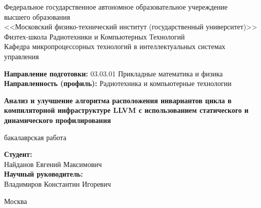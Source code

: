 \begin{center}
    Федеральное государственное автономное образовательное учереждение\\
    высшего образования\\
    <<Московский физико-технический институт (государственный университет)>> \\

    Физтех-школа Радиотехники и Компьютерных Технологий \\

    Кафедра микропроцессорных технологий в интеллектуальных системах управления\\

\end{center}

\vspace{1em}

\begin{flushleft}

    \textbf{Направление подготовки:} 03.03.01 Прикладные математика и физика\\
    \textbf{Направленность (профиль):} Радиотехника и компьютерные технологии\\

\end{flushleft}


\begin{center}
    \vspace{\fill}
    \Large{\textbf{Анализ и улучшение алгоритма расположения инвариантов цикла в компиляторной инфраструктуре LLVM с использованием статического и динамического профилирования}}

    \normalsize{бакалаврская работа}
    \vspace{\fill}
\end{center}


\begin{flushright}
    \textbf{Студент:}\\
    Найданов Евгений Максимович\\
    \vspace{2em}
    \textbf{Научный руководитель:} \\
    Владимиров Константин Игоревич \\
\end{flushright}

\vspace{7em}

\begin{center}
    Москва \the\year{}
\end{center}

\thispagestyle{empty}

\newpage
\fancyfoot[c]{\thepage}
